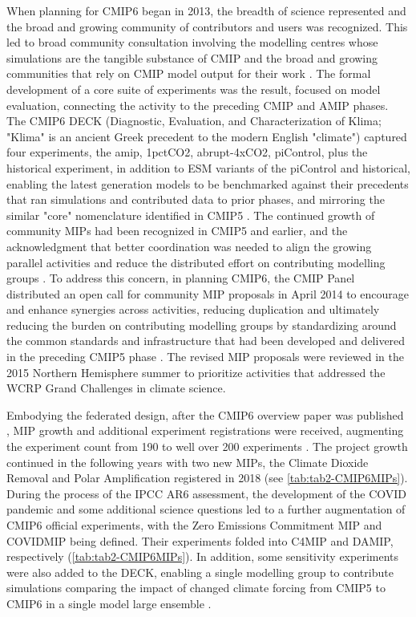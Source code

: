 \documentclass[gmd, preprint]{copernicus}
\begin{document}
When planning for CMIP6 began in 2013, the breadth of science represented and the broad and growing community of contributors and users was recognized. This led to broad community consultation involving the modelling centres whose simulations are the tangible substance of CMIP and the broad and growing communities that rely on CMIP model output for their work \citep{eyring_overview_2016}. The formal development of a core suite of experiments was the result, focused on model evaluation, connecting the activity to the preceding CMIP and AMIP phases. The CMIP6 DECK (Diagnostic, Evaluation, and Characterization of Klima; "Klima" is an ancient Greek precedent to the modern English "climate") captured four experiments, the amip, 1pctCO2, abrupt-4xCO2, piControl, plus the historical experiment, in addition to ESM variants of the piControl and historical, enabling the latest generation models to be benchmarked against their precedents that ran simulations and contributed data to prior phases, and mirroring the similar "core" nomenclature identified in CMIP5 \citep{stouffer_cmip5_2011}. The continued growth of community MIPs had been recognized in CMIP5 and earlier, and the acknowledgment that better coordination was needed to align the growing parallel activities and reduce the distributed effort on contributing modelling groups \citep{eyring_overview_2016}. To address this concern, in planning CMIP6, the CMIP Panel distributed an open call for community MIP proposals in April 2014 to encourage and enhance synergies across activities, reducing duplication and ultimately reducing the burden on contributing modelling groups by standardizing around the common standards and infrastructure that had been developed and delivered in the preceding CMIP5 phase \citep{eyring_overview_2016}. The revised MIP proposals were reviewed in the 2015 Northern Hemisphere summer to prioritize activities that addressed the WCRP Grand Challenges in climate science.

Embodying the federated design, after the CMIP6 overview paper was published \citet{eyring_overview_2016}, MIP growth and additional experiment registrations were received, augmenting the experiment count from 190 to well over 200 experiments \citep{balaji_requirements_2018}. The project growth continued in the following years with two new MIPs, the Climate Dioxide Removal \citep[CDRMIP;][]{keller_carbon_2018} and Polar Amplification \citep[PAMIP;][]{smith_polar_2019} registered in 2018 (see \autoref{tab:tab2-CMIP6MIPs}). During the process of the IPCC AR6 assessment, the development of the COVID pandemic and some additional science questions led to a further augmentation of CMIP6 official experiments, with the Zero Emissions Commitment MIP \citep[ZECMIP;][]{jones_zero_2019} and COVIDMIP \citep{lamboll_modifying_2021} being defined. Their experiments folded into C4MIP and DAMIP, respectively (\autoref{tab:tab2-CMIP6MIPs}). In addition, some sensitivity experiments were also added to the DECK, enabling a single modelling group to contribute simulations comparing the impact of changed climate forcing from CMIP5 to CMIP6 in a single model large ensemble \citep{fyfe_significant_2021}.
\end{document}
